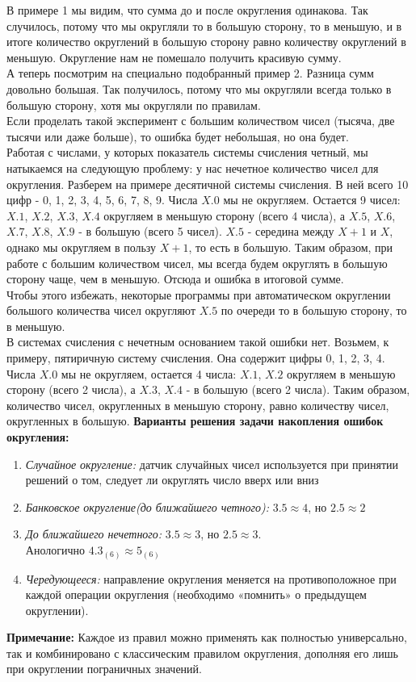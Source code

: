В примере 1 мы видим, что сумма до и после округления одинакова. Так случилось, потому что мы округляли то в большую сторону, то в меньшую, и в итоге количество округлений в большую сторону равно количеству округлений в меньшую. Округление нам не помешало получить красивую сумму.
\\А теперь посмотрим на специально подобранный пример 2. Разница сумм довольно большая. Так получилось, потому что мы округляли всегда только в большую сторону, хотя мы округляли по правилам.
\\Если проделать такой эксперимент с большим количеством чисел (тысяча, две тысячи или даже больше), то ошибка будет небольшая, но она будет.
\\Работая с числами, у которых показатель системы счисления четный, мы натыкаемся на следующую проблему: у нас нечетное количество чисел для округления. Разберем на примере десятичной системы счисления. В ней всего 10 цифр - 0, 1, 2, 3, 4, 5, 6, 7, 8, 9. Числа $X.0$ мы не округляем. Остается 9 чисел: $X.1$, $X.2$, $X.3$, $X.4$ округляем в меньшую сторону (всего 4 числа), а $X.5$, $X.6$, $X.7$, $X.8$, $X.9$ - в большую (всего 5 чисел). $X.5$ - середина между $X+1$ и $X$, однако мы округляем в пользу $X+1$, то есть в большую. Таким образом, при работе с большим количеством чисел, мы всегда будем округлять в большую сторону чаще, чем в меньшую. Отсюда и ошибка в итоговой сумме.
\\Чтобы этого избежать, некоторые программы при автоматическом округлении большого количества чисел округляют $X.5$ по очереди то в большую сторону, то в меньшую.
\\В системах счисления с нечетным основанием такой ошибки нет. Возьмем, к примеру, пятиричную систему счисления. Она содержит цифры 0, 1, 2, 3, 4. Числа $X.0$ мы не округляем, остается 4 числа: $X.1$, $X.2$ округляем в меньшую сторону (всего 2 числа), а $X.3$, $X.4$ - в большую (всего 2 числа). Таким образом, количество чисел, округленных в меньшую сторону, равно количеству чисел, округленных в большую.
\textbf{Варианты решения задачи накопления ошибок округления:}
\begin{enumerate}
\item \emph{Случайное округление:} датчик случайных чисел используется при принятии решений о том, следует ли округлять число вверх или вниз
\item \emph{Банковское округление(до ближайшего четного):} $3.5 \approx 4$, но $2.5 \approx 2$
\item \emph{До ближайшего нечетного:} $3.5 \approx 3$, но $2.5 \approx 3$. \\Анологично $4.3_{(6)} \approx 5_{(6)} $
\item \emph{Чередующееся:} направление округления меняется на противоположное при
каждой операции округления (необходимо «помнить» о предыдущем округлении).
\end{enumerate}
\textbf{Примечание:} Каждое из правил можно применять как полностью
универсально, так и комбинировано с классическим правилом округления,
дополняя его лишь при округлении пограничных значений.
